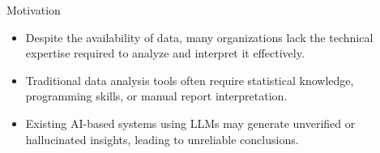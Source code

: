 
\begin{frame}{Motivation}
    \begin{itemize}
        \item Despite the availability of data, many organizations lack the technical expertise required to analyze and interpret it effectively.
        \item Traditional data analysis tools often require statistical knowledge, programming skills, or manual report interpretation.
        \item Existing AI-based systems using LLMs may generate unverified or hallucinated insights, leading to unreliable conclusions.
    \end{itemize}
\end{frame}

